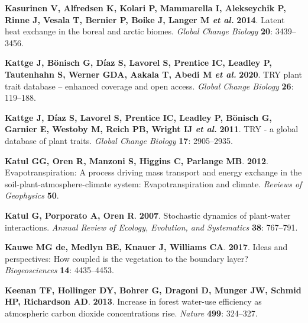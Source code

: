 \documentclass[11pt,twoside]{reedthesis}
\begin{document}
\hypertarget{ref-kasurinen_latent_2014}{}
\textbf{\textnormal{Kasurinen V}, \textnormal{Alfredsen K},
\textnormal{Kolari P}, \textnormal{Mammarella I},
\textnormal{Alekseychik P}, \textnormal{Rinne J}, \textnormal{Vesala T},
\textnormal{Bernier P}, \textnormal{Boike J}, \textnormal{Langer M}
\emph{et al.}} \textbf{2014}. Latent heat exchange in the boreal and
arctic biomes. \emph{Global Change Biology} \textbf{20}: 3439--3456.

\hypertarget{ref-Kattge2020}{}
\textbf{\textnormal{Kattge J}, \textnormal{Bönisch G}, \textnormal{Díaz
S}, \textnormal{Lavorel S}, \textnormal{Prentice IC},
\textnormal{Leadley P}, \textnormal{Tautenhahn S}, \textnormal{Werner
GDA}, \textnormal{Aakala T}, \textnormal{Abedi M} \emph{et al.}}
\textbf{2020}. TRY plant trait database -- enhanced coverage and open
access. \emph{Global Change Biology} \textbf{26}: 119--188.

\hypertarget{ref-Kattge2011}{}
\textbf{\textnormal{Kattge J}, \textnormal{Díaz S}, \textnormal{Lavorel
S}, \textnormal{Prentice IC}, \textnormal{Leadley P},
\textnormal{Bönisch G}, \textnormal{Garnier E}, \textnormal{Westoby M},
\textnormal{Reich PB}, \textnormal{Wright IJ} \emph{et al.}}
\textbf{2011}. TRY - a global database of plant traits. \emph{Global
Change Biology} \textbf{17}: 2905--2935.

\hypertarget{ref-katul_evapotranspiration_2012}{}
\textbf{\textnormal{Katul GG}, \textnormal{Oren R}, \textnormal{Manzoni
S}, \textnormal{Higgins C}, \textnormal{Parlange MB}}. \textbf{2012}.
Evapotranspiration: A process driving mass transport and energy exchange
in the soil-plant-atmosphere-climate system: Evapotranspiration and
climate. \emph{Reviews of Geophysics} \textbf{50}.

\hypertarget{ref-Katul2007}{}
\textbf{\textnormal{Katul G}, \textnormal{Porporato A}, \textnormal{Oren
R}}. \textbf{2007}. Stochastic dynamics of plant-water interactions.
\emph{Annual Review of Ecology, Evolution, and Systematics} \textbf{38}:
767--791.

\hypertarget{ref-de_kauwe_ideas_2017}{}
\textbf{\textnormal{Kauwe MG de}, \textnormal{Medlyn BE},
\textnormal{Knauer J}, \textnormal{Williams CA}}. \textbf{2017}. Ideas
and perspectives: How coupled is the vegetation to the boundary layer?
\emph{Biogeosciences} \textbf{14}: 4435--4453.

\hypertarget{ref-Keenan2013}{}
\textbf{\textnormal{Keenan TF}, \textnormal{Hollinger DY},
\textnormal{Bohrer G}, \textnormal{Dragoni D}, \textnormal{Munger JW},
\textnormal{Schmid HP}, \textnormal{Richardson AD}}. \textbf{2013}.
Increase in forest water-use efficiency as atmospheric carbon dioxide
concentrations rise. \emph{Nature} \textbf{499}: 324--327.
\end{document}
